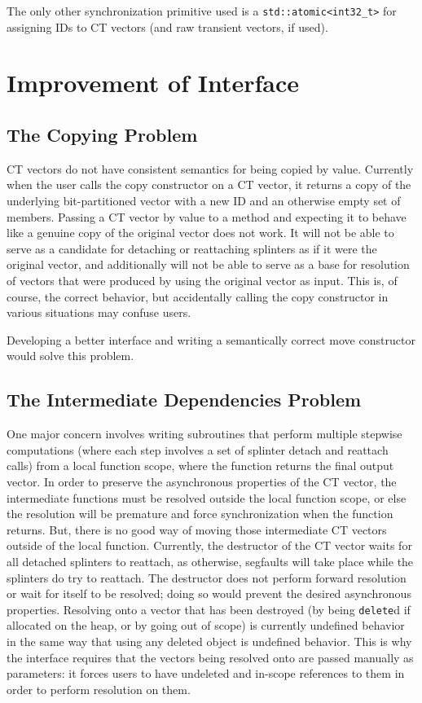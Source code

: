 The only other synchronization primitive used is a
\texttt{std::atomic<int32\_t>} for assigning IDs to CT vectors (and raw
transient vectors, if used).

\section{Improvement of Interface}

\subsection{The Copying Problem}
CT vectors do not have consistent semantics for being copied by value. Currently
when the user calls the copy constructor on a CT vector, it returns a copy of
the underlying bit-partitioned vector with a new ID and an otherwise empty set
of members. Passing a CT vector by value to a method and expecting it to behave
like a genuine copy of the original vector does not work. It will not be able to
serve as a candidate for detaching or reattaching splinters as if it were the
original vector, and additionally will not be able to serve as a base for
resolution of vectors that were produced by using the original vector as input.
This is, of course, the correct behavior, but accidentally calling the copy
constructor in various situations may confuse users.

Developing a better interface and writing a semantically correct move
constructor would solve this problem.

\subsection{The Intermediate Dependencies Problem}
One major concern involves
writing subroutines that perform multiple stepwise computations (where each step
involves a set of splinter detach and reattach calls) from a local function
scope, where the function returns the final output vector. In order to preserve
the asynchronous properties of the CT vector, the intermediate functions must
be resolved outside the local function scope, or else the resolution will be
premature and force synchronization when the function returns. But, there is no
good way of moving those intermediate CT vectors outside of the local function.
Currently, the destructor of the CT vector waits for all detached splinters to
reattach, as otherwise, segfaults will take place while the splinters do try to
reattach. The destructor does not perform forward resolution or wait for itself
to be resolved; doing so would prevent the desired asynchronous properties.
Resolving onto a vector that has been destroyed (by being \texttt{delete}d if
allocated on the heap, or by going out of scope) is currently undefined behavior
in the same way that using any deleted object is undefined behavior. This is why
the interface requires that the vectors being resolved onto are passed manually
as parameters: it forces users to have undeleted and in-scope references to
them in order to perform resolution on them.


